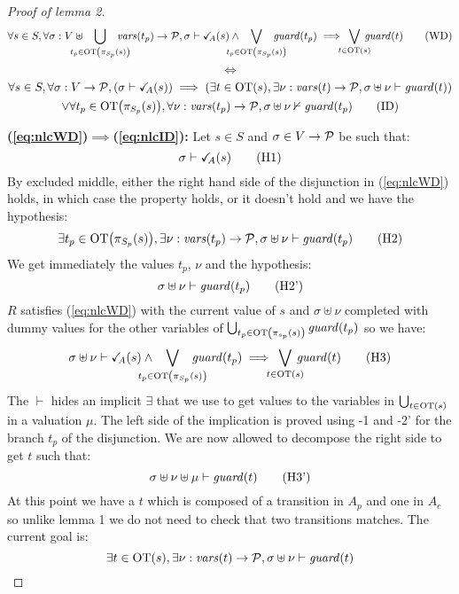 \documentclass{article}
\begin{document}
\begin{proof}[Proof of lemma 2]
\[ \forall s \in S, \forall \sigma: V \uplus \bigcup_\subbox{t_p \in \fOT{\pi_{S_p}\mpar{s}}} \fvars{t_p} \to \values, \sigma \vdash \reach{A}\mpar{s} \wedge \bigvee_\subbox{t_p \in \fOT{\pi_{S_p}\mpar{s}}} \fguard{t_p} \implies \bigvee_\subbox{t \in \fOT{s}} \fguard{t} \tag{WD}\label{eq:nlcWD} \]
\[ \iff \]
\begin{multline*}
	\forall s \in S, \forall \sigma: V \to \mathcal{P}, {\left(\sigma \vdash \checkmark_{\!\! A}{\left(s\right)}\right)} \implies {\left(\exists t \in \mathrm{OT}{\left(s\right)}, \exists \nu: \mathit{vars}{\left(t\right)} \to \mathcal{P}, \sigma \uplus \nu \vdash \mathit{guard}{\left(t\right)}\right)} \\
	\vee \forall t_p \in \mathrm{OT}{\left(\pi_{S_p}{\left(s\right)}\right)}, \forall \nu: \mathit{vars}{\left(t_p\right)} \to \mathcal{P}, \sigma \uplus \nu \nvdash \mathit{guard}{\left(t_p\right)} \tag{ID}\label{eq:nlcID}
\end{multline*}
\item[\bf(\ref{eq:nlcWD})\(\implies\)(\ref{eq:nlcID}):]
	Let \(s \in S\) and \(\sigma \in V \to \mathcal{P}\) be such that:
	\[ \sigma \vdash \reach{A}\mpar{s} \hyp{1} \]
	By excluded middle, either the right hand side of the disjunction in (\ref{eq:nlcWD}) holds, in which case the property holds, or it doesn't hold and we have the hypothesis:
	\[ \exists t_p \in \fOT{\pi_{S_p}\mpar{s}}, \exists \nu: \fvars{t_p} \to \values, \sigma \uplus \nu \vdash \fguard{t_p} \hyp{2} \]
	We get immediately the values \(t_p\), \(\nu\) and the hypothesis:
	\[ \sigma \uplus \nu \vdash \fguard{t_p} \hyp{2'} \]
	\(R\) satisfies (\ref{eq:nlcWD}) with the current value of \(s\) and \(\sigma \uplus \nu\) completed with dummy values for the other variables of \(\bigcup_{t_p \in \mathrm{OT}{\left(\pi_{s_p}{\left(s\right)}\right)}} \mathit{guard}{\left(t_p\right)}\) so we have:
	\[ \sigma \uplus \nu \vdash \reach{A}\mpar{s} \wedge \bigvee_\subbox{t_p \in \fOT{\pi_{S_p}\mpar{s}}} \fguard{t_p} \implies \bigvee_\subbox{t \in \fOT{s}} \fguard{t} \hyp{3} \]
	The \(\vdash\) hides an implicit \(\exists\) that we use to get values to the variables in \(\bigcup_{t \in \mathrm{OT}{\left(s\right)}}\) in a valuation \(\mu\).
	The left side of the implication is proved using \hyp{1} and \hyp{2'} for the branch \(t_p\) of the disjunction.
	We are now allowed to decompose the right side to get \(t\) such that:
	\[ \sigma \uplus \nu \uplus \mu \vdash \fguard{t} \hyp{3'} \]
	At this point we have a \(t\) which is composed of a transition in \(A_p\) and one in \(A_c\) so unlike lemma 1 we do not need to check that two transitions matches.
	The current goal is:
	\[ \exists t \in \mathrm{OT}{\left(s\right)}, \exists \nu: \mathit{vars}{\left(t\right)} \to \mathcal{P}, \sigma \uplus \nu \vdash \mathit{guard}{\left(t\right)} \]

\end{proof}
\end{document}
